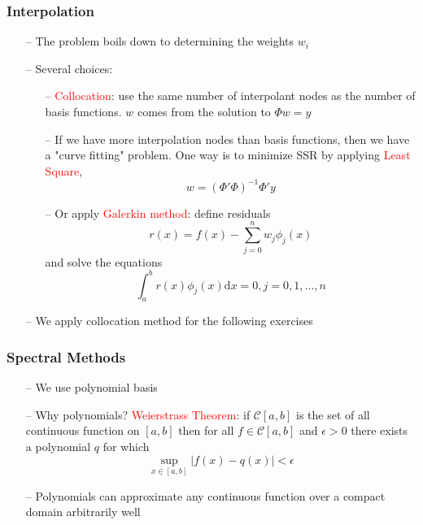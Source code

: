 \documentclass[aspectratio=169, 11pt]{beamer}
\begin{document}
\begin{frame}
\frametitle{Interpolation}
  \begin{itemize}
    \item[--] The problem boils down to determining the weights $w_{i}$
    \item[--] Several choices:
    \begin{itemize}
      \item[--] \textcolor{red}{Collocation}: use the same number of interpolant nodes as the number of basis functions. $w$ comes from the solution to $\Phi w=y$
      \item[--] If we have more interpolation nodes than basis functions, then we have a "curve fitting" problem. One way is to minimize SSR by applying \textcolor{red}{Least Square},
      \[
        w=\left(\Phi'\Phi\right)^{-1}\Phi'y
      \]
      \item[--] Or apply \textcolor{red}{Galerkin method}: define residuals
      \[
        r(x)=f(x)-\sum_{j=0}^{n}w_{j}\phi_{j}\left(x\right)
      \]
      and solve the equations
      \[
        \int_{a}^{b}r\left(x\right)\phi_{j}\left(x\right)\mathrm{d}x=0,j=0,1,\ldots,n
      \]
    \end{itemize}
    \bigskip
    \item[--] We apply collocation method for the following exercises
  \end{itemize}
\end{frame}

\begin{frame}
\frametitle{Spectral Methods}
  \begin{itemize}
    \item[--] We use polynomial basis
    \bigskip
    \item[--] Why polynomials? \textcolor{red}{Weierstrass Theorem}: if $\mathcal{C}\left[a,b\right]$ is the set of all continuous function on $\left[a,b\right]$ then for all $f\in\mathcal{C}\left[a,b\right]$ and $\epsilon>0$ there exists a polynomial $q$ for which
    \[
      \sup_{x\in\left[a,b\right]}\left|f\left(x\right)-q\left(x\right)\right|<\epsilon
    \]
    \bigskip
    \item[--] Polynomials can approximate any continuous function over a compact domain arbitrarily well
  \end{itemize}
\end{frame}
\end{document}
